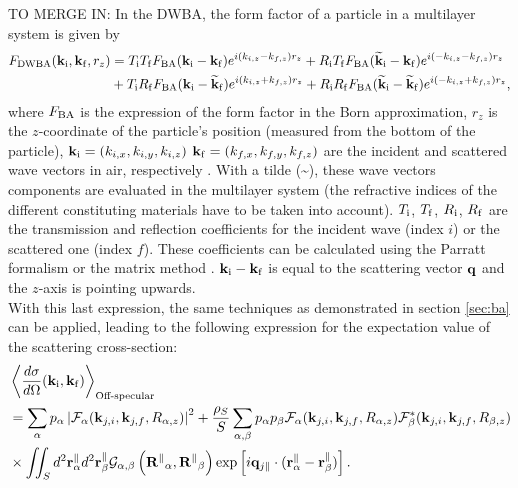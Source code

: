 TO MERGE IN:
In the DWBA, the form factor of a particle in a multilayer system is given by
\begin{align}
F_{\rm{DWBA}} (\mathbf{k}_{\rm i},\mathbf{k}_{\rm f}, r_z) & = T_{\rm i} T_{\rm f} F_{\rm{BA}} (\mathbf{k}_{\rm i}-\mathbf{k}_{\rm f}) e^{i (k_{i,z}-k_{f,z}) r_z} + R_{\rm i} T_{\rm f} F_{\rm{BA}}(\mathbf{\widetilde{k}}_{\rm i}-\mathbf{k}_{\rm f}) e^{i(-k_{i,z}-k_{f,z})r_z}
 \nonumber \\
  &+ T_{\rm i} R_{\rm f} F_{\rm{BA}}(\mathbf{k}_{\rm i}-\mathbf{\widetilde{k}}_{\rm f})e^{i(k_{i,z}+k_{f,z})r_z} + R_{\rm i}R_{\rm f}F_{\rm{BA}} (\mathbf{\widetilde{k}}_{\rm i}-\mathbf{\widetilde{k}}_{\rm f})e^{i(-k_{i,z}+k_{f,z})r_z}, \label{Edwbageneral}
\end{align}
where $F_{\rm{BA}}$ is the expression of the form factor in the Born approximation, $r_z$ is the $z$-coordinate of the particle's position (measured from the bottom of the particle), $\mathbf{k}_{\rm i}=(k_{i,x}, k_{i,y}, k_{i,z})$ $\mathbf{k}_{\rm f}=(k_{f,x}, k_{f,y}, k_{f,z})$ are the incident and scattered wave vectors in air, respectively \cite{RaSS95}.
With a tilde (\~{}), these wave vectors components are evaluated in the multilayer system (the refractive indices of the different constituting materials have to be taken into account). 
$T_{\rm i}$, $T_{\rm f}$, $R_{\rm i}$, $R_{\rm f}$ are the transmission and reflection coefficients for the incident wave (index $i$) or the scattered one (index $f$). These coefficients can be calculated using the Parratt formalism \cite{Par54} or the matrix method \cite{BoWo99}. $\mathbf{k}_{\rm i}-\mathbf{k}_{\rm f}$ is equal to the scattering vector $\mathbf{q}$ and the $z$-axis is pointing upwards.\\

With this last expression, the same techniques as demonstrated in section \ref{sec:ba} can be applied, leading to the following expression for the expectation value of the scattering cross-section:
\begin{align*}
  & \left\langle \frac{d\sigma}{d\Omega}(\mathbf{k}_{\rm i},\mathbf{k}_{\rm f}) \right\rangle_{\text{Off-specular}}  \\
  & = \sum_\alpha p_\alpha \left\lvert \mathcal{F}_\alpha(\mathbf{k}_{j,i},\mathbf{k}_{j,f}, R_{\alpha,z})\right\rvert ^2 + \frac{\rho_S}{S}\sum_{\alpha,\beta} p_\alpha p_\beta \mathcal{F}_\alpha (\mathbf{k}_{j,i},\mathbf{k}_{j,f}, R_{\alpha,z})\mathcal{F}_\beta^*(\mathbf{k}_{j,i},\mathbf{k}_{j,f}, R_{\beta,z}) \\
  & \times \iint_S d^2\mathbf{r}_\alpha^\parallel d^2\mathbf{r}_\beta^\parallel \mathcal{G}_{\alpha ,\beta}\left( \mathbf{R^\parallel}_{\alpha} , \mathbf{R^\parallel}_{\beta} \right) \exp \left[ i\mathbf{q}_{j\parallel}\cdot (\mathbf{r}_\alpha^\parallel - \mathbf{r}_\beta^\parallel ) \right].
\end{align*}

